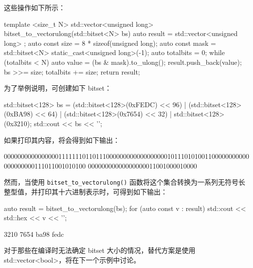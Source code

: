 这些操作如下所示：

\begin{cpp}
template <size_t N>
std::vector<unsigned long> bitset_to_vectorulong(std::bitset<N> bs)
{
    auto result = std::vector<unsigned long> {};
    auto const size = 8 * sizeof(unsigned long);
    auto const mask = std::bitset<N>{ static_cast<unsigned long>(-1)};
    auto totalbits = 0;
    while (totalbits < N)
    {
        auto value = (bs & mask).to_ulong();
        result.push_back(value);
        bs >>= size;
        totalbits += size;
    }
    return result;
}
\end{cpp}

为了举例说明，可创建如下 bitset：

\begin{cpp}
std::bitset<128> bs =
    (std::bitset<128>(0xFEDC) << 96) |
    (std::bitset<128>(0xBA98) << 64) |
    (std::bitset<128>(0x7654) << 32) |
    std::bitset<128>(0x3210);
std::cout << bs << '\n';
\end{cpp}

如果打印其内容，将会得到如下输出：

\begin{shell}
000000000000000011111110110111000000000000000000101110101001100000000000000000000111011001010100
00000000000000000011001000010000
\end{shell}

然而，当使用 \verb|bitset_to_vectorulong()| 函数将这个集合转换为一系列无符号长整型值，并打印其十六进制表示时，可得到如下输出：

\begin{cpp}
auto result = bitset_to_vectorulong(bs);
for (auto const v : result)
    std::cout << std::hex << v << '\n';
\end{cpp}

\begin{shell}
3210
7654
ba98
fedc
\end{shell}

对于那些在编译时无法确定 bitset 大小的情况，替代方案是使用 std::vector<bool>，将在下一个示例中讨论。





